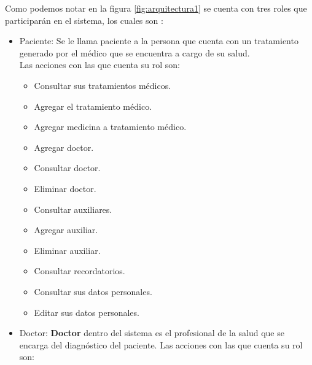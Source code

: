 Como podemos notar en la figura \ref{fig:arquitectura1} se cuenta con tres roles que participarán en el sistema, los cuales son :
\begin{itemize}

	\item Paciente: Se le llama paciente a la persona que cuenta con un tratamiento generado por el médico que se encuentra a cargo de su salud.\\
	
	Las acciones con las que cuenta su rol son:
	\begin{itemize}
		\item Consultar sus tratamientos médicos.
		\item Agregar el tratamiento médico.
		\item Agregar medicina a tratamiento médico.
		\item Agregar doctor.
		\item Consultar doctor.
		\item Eliminar doctor.
		\item Consultar auxiliares.	
		\item Agregar auxiliar.
		\item Eliminar auxiliar.
		\item Consultar recordatorios.
		\item Consultar sus datos personales.
		\item Editar sus datos personales.
	\end{itemize}

	\item Doctor: \textbf{Doctor} dentro del sistema es el profesional de la salud que se encarga del diagnóstico del paciente.
	Las acciones con las que cuenta su rol son:
		\begin{itemize}
			

\end{itemize}
\end{itemize}
